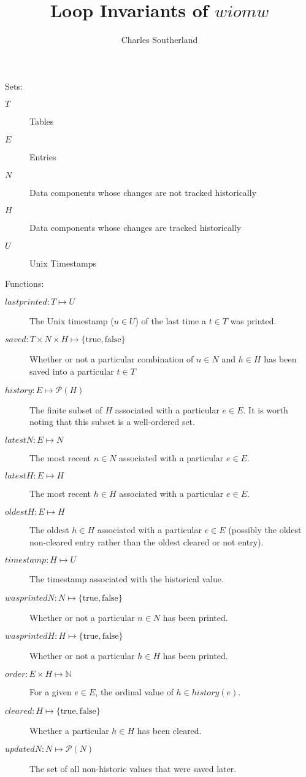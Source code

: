 \documentclass{article}
\title{Loop Invariants of $wiomw$}
\author{Charles Southerland}
\begin{document}
Sets:
\begin{description}
	\item[\(T\)]
		Tables
	\item[\(E\)]
		Entries
	\item[\(N\)]
		Data components whose changes are not tracked historically
	\item[\(H\)]
		Data components whose changes are tracked historically
	\item[\(U\)]
		Unix Timestamps
\end{description}
Functions:
\begin{description}
	\item[\(lastprinted: T \mapsto U\)]
		The Unix timestamp (\(u \in U\)) of the last time a \(t \in T\) was printed.
	\item[\(saved: T \times N \times H \mapsto \{\mathrm{true}, \mathrm{false}\}\)]
		Whether or not a particular combination of \(n \in N\) and \(h \in H\) has been saved into a particular \(t \in T\)
	\item[\(history: E \mapsto \mathcal{P}(H)\)]
		The finite subset of \(H\) associated with a particular \(e \in E\). It is worth noting that this subset is a well-ordered set.
	\item[\(latestN: E \mapsto N\)]
		The most recent \(n \in N\) associated with a particular \(e \in E\).
	\item[\(latestH: E \mapsto H\)]
		The most recent \(h \in H\) associated with a particular \(e \in E\).
	\item[\(oldestH: E \mapsto H\)]
		The oldest \(h \in H\) associated with a particular \(e \in E\) (possibly the oldest non-cleared entry rather than the oldest cleared or not entry).
	\item[\(timestamp: H \mapsto U\)]
		The timestamp associated with the historical value.
	\item[\(wasprintedN: N \mapsto \{\mathrm{true}, \mathrm{false}\}\)]
		Whether or not a particular \(n \in N\) has been printed.
	\item[\(wasprintedH: H \mapsto \{\mathrm{true}, \mathrm{false}\}\)]
		Whether or not a particular \(h \in H\) has been printed.
	\item[\(order: E \times H \mapsto \mathbb{N}\)]
		For a given \(e \in E\), the ordinal value of \(h \in history(e)\).
	\item[\(cleared: H \mapsto \{\mathrm{true}, \mathrm{false}\}\)]
		Whether a particular \(h \in H\) has been cleared.
	\item[\(updatedN: N \mapsto \mathcal{P}(N)\)]
		The set of all non-historic values that were saved later.
\end{description}
\end{document}
